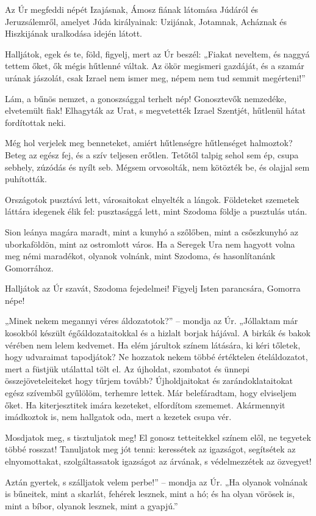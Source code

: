\documentclass[twoside]{article}
\begin{document}
\begin{lectio}{Az Úr megfeddi népét}
\noindent Izajásnak, Ámosz fiának látomása Júdáról és Jeruzsálemről, amelyet Júda királyainak: Uzijának, Jotamnak, Acháznak és Hiszkijának uralkodása idején látott.

Halljátok, egek és te, föld, figyelj, mert az Úr beszél: „Fiakat neveltem, és naggyá tettem őket, ők mégis hűtlenné váltak. Az ökör megismeri gazdáját, és a szamár urának jászolát, csak Izrael nem ismer meg, népem nem tud semmit megérteni!”

Lám, a bűnös nemzet, a gonoszsággal terhelt nép! Gonosztevők nemzedéke, elvetemült fiak! Elhagyták az Urat, s megvetették Izrael Szentjét, hűtlenül hátat fordítottak neki.

Még hol verjelek meg benneteket, amiért hűtlenségre hűtlenséget halmoztok? Beteg az egész fej, és a szív teljesen erőtlen. Tetőtől talpig sehol sem ép, csupa sebhely, zúzódás és nyílt seb. Mégsem orvosolták, nem kötözték be, és olajjal sem puhították.

Országotok pusztává lett, városaitokat elnyelték a lángok. Földeteket szemetek láttára idegenek élik fel: pusztasággá lett, mint Szodoma földje a pusztulás után.

Sion leánya magára maradt, mint a kunyhó a szőlőben, mint a csőszkunyhó az uborkaföldön, mint az ostromlott város. Ha a Seregek Ura nem hagyott volna meg némi maradékot, olyanok volnánk, mint Szodoma, és hasonlítanánk Gomorrához.

Halljátok az Úr szavát, Szodoma fejedelmei! Figyelj Isten parancsára, Gomorra népe!

„Minek nekem megannyi véres áldozatotok?” – mondja az Úr. „Jóllaktam már kosokból készült égőáldozataitokkal és a hizlalt borjak hájával. A birkák és bakok vérében nem lelem kedvemet. Ha elém járultok színem látására, ki kéri tőletek, hogy udvaraimat tapodjátok? Ne hozzatok nekem többé értéktelen ételáldozatot, mert a füstjük utálattal tölt el. Az újholdat, szombatot és ünnepi összejöveteleiteket hogy tűrjem tovább? Újholdjaitokat és zarándoklataitokat egész szívemből gyűlölöm, terhemre lettek. Már belefáradtam, hogy elviseljem őket. Ha kiterjesztitek imára kezeteket, elfordítom szememet. Akármennyit imádkoztok is, nem hallgatok oda, mert a kezetek csupa vér.

Mosdjatok meg, s tisztuljatok meg! El gonosz tetteitekkel színem elől, ne tegyetek többé rosszat! Tanuljatok meg jót tenni: keressétek az igazságot, segítsétek az elnyomottakat, szolgáltassatok igazságot az árvának, s védelmezzétek az özvegyet!

Aztán gyertek, s szálljatok velem perbe!” – mondja az Úr. „Ha olyanok volnának is bűneitek, mint a skarlát, fehérek lesznek, mint a hó; és ha olyan vörösek is, mint a bíbor, olyanok lesznek, mint a gyapjú.”
\end{lectio}
\end{document}
